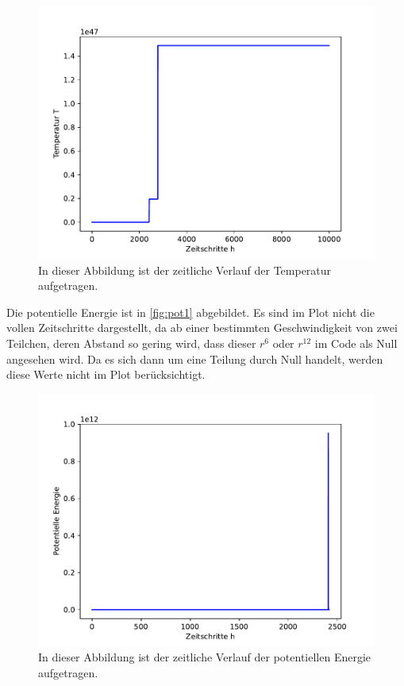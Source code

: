\begin{figure}[H]
    \centering
    \includegraphics[scale=0.5]{MolDyn/Medium Boy/temperature.pdf}
    \caption{In dieser Abbildung ist der zeitliche Verlauf der Temperatur aufgetragen.}
    \label{fig:temp1}
\end{figure}
\newpage
Die potentielle Energie ist in \autoref{fig:pot1} abgebildet.
Es sind im Plot nicht die vollen Zeitschritte dargestellt, da ab einer bestimmten Geschwindigkeit von zwei Teilchen, deren Abstand so gering wird, dass dieser $r^6$ oder $r^{12}$ im Code als Null angesehen wird.
Da es sich dann um eine Teilung durch Null handelt, werden diese Werte nicht im Plot berücksichtigt.
\begin{figure}[H]
    \centering
    \includegraphics[scale=0.5]{MolDyn/Medium Boy/potential_energy.pdf}
    \caption{In dieser Abbildung ist der zeitliche Verlauf der potentiellen Energie aufgetragen.}
    \label{fig:pot1}
\end{figure}
